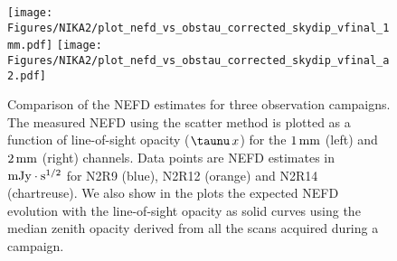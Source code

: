 \begin{figure}[!thbp]
\begin{center}
  \texttt{[image: Figures/NIKA2/plot\_nefd\_vs\_obstau\_corrected\_skydip\_vfinal\_1mm.pdf]}
  \texttt{[image: Figures/NIKA2/plot\_nefd\_vs\_obstau\_corrected\_skydip\_vfinal\_a2.pdf]}
  \caption{Comparison of the NEFD estimates for three observation
    campaigns. The measured NEFD using the scatter method is plotted as a function of
    line-of-sight opacity ($\taunu\,x$) for the $1\,\rm{mm}$ (left) and $2\,\rm{mm}$ (right)
    channels. Data points are NEFD estimates in $\rm{mJy}\cdot s^{1/2}$ for N2R9 (blue), N2R12 (orange)
    and N2R14 (chartreuse). We also show in the plots the expected NEFD evolution
    with the line-of-sight opacity as solid curves using the median
    zenith opacity derived from all the scans acquired during a campaign.}
  \label{fig:nefdvsbackground_below_1Jy}
\end{center}
\end{figure}

